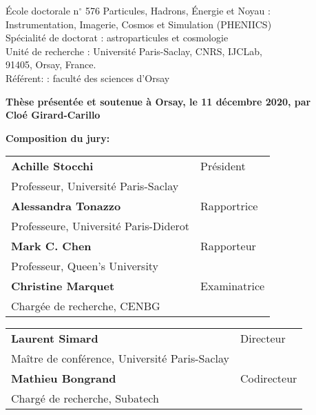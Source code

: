 \documentclass[12pt,a4paper]{book}
\begin{document}
\begin{titlepage}
École doctorale n$^{\circ}$ 576 Particules, Hadrons, Énergie et Noyau :\\Instrumentation, Imagerie, Cosmos et Simulation (PHENIICS)\\
\fontsize{10}{15}\selectfont
Spécialité de doctorat : astroparticules et cosmologie\\
\fontsize{9}{15}\selectfont
Unité de recherche : Université Paris-Saclay, CNRS, IJCLab, \\91405, Orsay, France.\\
Référent: : faculté des sciences d’Orsay
\vspace{15mm}

\textbf{Thèse présentée et soutenue à Orsay, le 11 décembre 2020, par}\\
\bigskip
\Large {\color{Prune} \textbf{Cloé Girard-Carillo}}


\vspace{\fill} %

\flushleft \small \textbf{Composition du jury:}
\bigskip


\scriptsize
\begin{tabular}{|p{8cm}l}
\arrayrulecolor{Prune}
\textbf{Achille Stocchi} &   Président\\
Professeur, Université Paris-Saclay & \\
\textbf{Alessandra Tonazzo} &  Rapportrice \\
Professeure, Université Paris-Diderot   &   \\
\textbf{Mark C. Chen} &  Rapporteur \\
Professeur, Queen's University  &   \\
\textbf{Christine Marquet} &  Examinatrice \\
Chargée de recherche, CENBG   &   \\

\end{tabular}

\medskip
\begin{tabular}{|p{8cm}l}\arrayrulecolor{white}
\textbf{Laurent Simard} &   Directeur\\
Maître de conférence, Université Paris-Saclay & \\
\textbf{Mathieu Bongrand} &   Codirecteur\\
Chargé de recherche, Subatech  &   \\


\end{tabular}


\end{titlepage}
\end{document}
